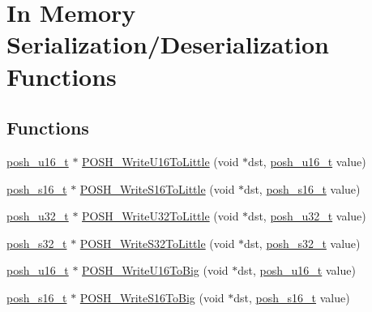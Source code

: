 \hypertarget{group__MemoryBuffer}{}\section{In Memory Serialization/\+Deserialization Functions}
\label{group__MemoryBuffer}
\subsection*{Functions}
\begin{DoxyCompactItemize}
\item 
\hyperlink{group__PoshTypes_ga8ef2f2264276677d018795b0ff67d486}{posh\+\_\+u16\+\_\+t} $\ast$ \hyperlink{group__MemoryBuffer_gabc9ddeabcbc3696e7cbbd30d40653292}{P\+O\+S\+H\+\_\+\+Write\+U16\+To\+Little} (void $\ast$dst, \hyperlink{group__PoshTypes_ga8ef2f2264276677d018795b0ff67d486}{posh\+\_\+u16\+\_\+t} value)
\item 
\hyperlink{group__PoshTypes_gabb2c3e11f94548b8c3bc63fbbe7c2110}{posh\+\_\+s16\+\_\+t} $\ast$ \hyperlink{group__MemoryBuffer_ga59abb65bd711a2cc79d190ed5ebeaf87}{P\+O\+S\+H\+\_\+\+Write\+S16\+To\+Little} (void $\ast$dst, \hyperlink{group__PoshTypes_gabb2c3e11f94548b8c3bc63fbbe7c2110}{posh\+\_\+s16\+\_\+t} value)
\item 
\hyperlink{group__PoshTypes_ga020bf929bf912667f0fa4312d816c2e0}{posh\+\_\+u32\+\_\+t} $\ast$ \hyperlink{group__MemoryBuffer_gac0bc12452f6b9a48b61c8fec0897297c}{P\+O\+S\+H\+\_\+\+Write\+U32\+To\+Little} (void $\ast$dst, \hyperlink{group__PoshTypes_ga020bf929bf912667f0fa4312d816c2e0}{posh\+\_\+u32\+\_\+t} value)
\item 
\hyperlink{group__PoshTypes_gaa13412fdeac2c495d0e0278bd28ac8cb}{posh\+\_\+s32\+\_\+t} $\ast$ \hyperlink{group__MemoryBuffer_ga745f6b6dd96c185f1a63120b20cff195}{P\+O\+S\+H\+\_\+\+Write\+S32\+To\+Little} (void $\ast$dst, \hyperlink{group__PoshTypes_gaa13412fdeac2c495d0e0278bd28ac8cb}{posh\+\_\+s32\+\_\+t} value)
\item 
\hyperlink{group__PoshTypes_ga8ef2f2264276677d018795b0ff67d486}{posh\+\_\+u16\+\_\+t} $\ast$ \hyperlink{group__MemoryBuffer_ga8d58963ea4443ea22f0c80552a10504c}{P\+O\+S\+H\+\_\+\+Write\+U16\+To\+Big} (void $\ast$dst, \hyperlink{group__PoshTypes_ga8ef2f2264276677d018795b0ff67d486}{posh\+\_\+u16\+\_\+t} value)
\item 
\hyperlink{group__PoshTypes_gabb2c3e11f94548b8c3bc63fbbe7c2110}{posh\+\_\+s16\+\_\+t} $\ast$ \hyperlink{group__MemoryBuffer_gaedbeff50ae5ab8bb235c9670d7d50e65}{P\+O\+S\+H\+\_\+\+Write\+S16\+To\+Big} (void $\ast$dst, \hyperlink{group__PoshTypes_gabb2c3e11f94548b8c3bc63fbbe7c2110}{posh\+\_\+s16\+\_\+t} value)

\end{DoxyCompactItemize}

